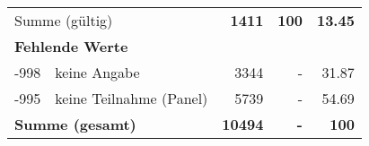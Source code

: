 \begin{longtable}{lXrrr}
     \midrule
     \multicolumn{2}{l}{Summe (gültig)} &
       \textbf{\num{1411}} &
     \textbf{\num{100}} &
       \textbf{\num[round-mode=places,round-precision=2]{13.45}} \\
     \multicolumn{5}{l}{\textbf{Fehlende Werte}}\\
       -998 &
       keine Angabe &
         \num{3344} &
        - &
         \num[round-mode=places,round-precision=2]{31.87} \\
       -995 &
       keine Teilnahme (Panel) &
         \num{5739} &
        - &
         \num[round-mode=places,round-precision=2]{54.69} \\
     \midrule
     \multicolumn{2}{l}{\textbf{Summe (gesamt)}} &
          \textbf{\num{10494}} &
        \textbf{-} &
        \textbf{\num{100}} \\
     \bottomrule
     \end{longtable}
     
